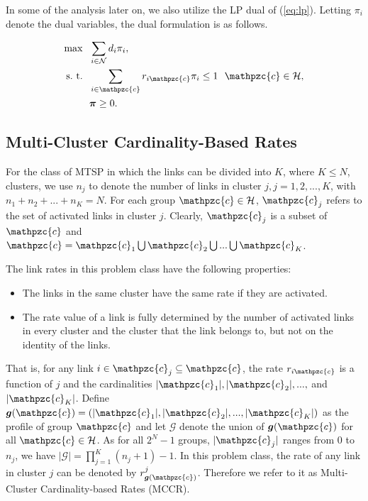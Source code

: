 \documentclass[10pt,onecolumn,journal,draftcls,oneside]{IEEEtran}
\newcommand{\CN}{\mathcal{N}}
\newcommand{\CH}{\mathcal{H}}
\newcommand{\Cc}{\mathpzc{c}}
\newcommand{\CG}{\mathcal{G}}
\newcommand{\Bg}{\boldsymbol{g}}
\newcommand{\Bpi}{\boldsymbol{\pi}}
\begin{document}
In some of the analysis later on, we also utilize the LP dual of (\ref{eq:lp}). Letting $\pi_i$ denote the dual variables, the dual formulation is as follows.

\begin{subequations}
\label{eq:dual}
\begin{align}
\max~~ & \sum_{i \in \CN} d_i \pi_i, \label{eq:dualobj}\\
\text{s.~t.}~~ & \sum_{i \in \Cc} r_{i\Cc} \pi_i \leq 1~~\Cc \in \CH, \label{eq:dualcons} \\
& \Bpi \geq 0.
\end{align}
\end{subequations}

\subsection{Multi-Cluster Cardinality-Based Rates}

For the class of MTSP in which the links can be divided into $K$, where $K \leq N$, clusters, we use $n_j$ to denote the number of links in cluster $j, j = 1, 2, ..., K$, with $n_1 + n_2 + ... + n_K = N$.
For each group $\Cc \in \CH$, $\Cc_j$ refers to the set of activated links in cluster $j$. Clearly, $\Cc_j$ is a subset of $\Cc$ and $\Cc = \Cc_1 \bigcup \Cc_2 \bigcup...\bigcup \Cc_K$. 

The link rates in this problem class have the following properties:

\begin{itemize}
\item The links in the same cluster have the same rate if they are activated.
\item The rate value of a link is fully determined by the number of activated links in every cluster and the cluster that the link belongs to, but not on the identity of the links.
\end{itemize}

That is, for any link $i \in \Cc_j \subseteq \Cc$, the rate $r_{i\Cc}$ is a function of $j$ and the cardinalities $|\Cc_1|, |\Cc_2|, ...,$ and $|\Cc_K|$. Define $\Bg(\Cc) = (|\Cc_1|, |\Cc_2|, ..., |\Cc_K|)$ as the profile of group $\Cc$ and let $\CG$ denote the union of $\Bg(\Cc)$ for all $\Cc \in \CH$. As for all $2^N -1$ groups, $|\Cc_j|$ ranges from $0$ to $n_j$, we have $|\CG| = \prod_{j=1}^K{(n_j+1)}-1$.
In this problem class, the rate of any link in cluster $j$ can be denoted by $r^j_{\Bg(\Cc)}$. Therefore we refer to it as Multi-Cluster Cardinality-based Rates (MCCR).
\end{document}
